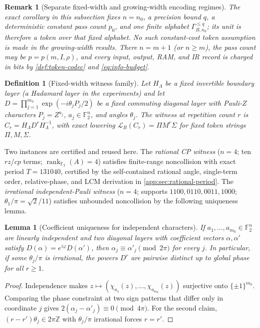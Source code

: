 \documentclass[aps,prx,reprint,floatfix,superscriptaddress]{revtex4-2}
\newtheorem{definition}{Definition}
\newtheorem{lemma}{Lemma}
\newtheorem{remark}{Remark}
\newcommand{\Ftwo}{\mathbb{F}_2}
\begin{document}
\begin{remark}[Separate fixed-width and growing-width encoding regimes]
\label{rem:encoding-regimes}
The exact corollary in this subsection fixes $n=n_0$, a precision bound
$q$, a deterministic constant pass count $p_0$, and one finite alphabet
$\Gamma_{B,n_0}^{\leq q}$; its unit is therefore a token over that fixed
alphabet.  No such constant-cost token assumption is made in the
growing-width results.  There $n=m+1$ (or $n\geq m$), the pass count may be
$p=p(m,I,\rho)$, and every input, output, RAM, and IR record is charged in
bits by \cref{def:token-codec} and \eqref{eq:info-budget}.
\end{remark}

\begin{definition}[Fixed-width witness family]
\label{def:witness-family}
Let $H_\Lambda$ be a fixed invertible boundary layer (a Hadamard layer in
the experiments) and let
$D = \prod_{j=1}^{m_0} \exp(-i\theta_j P_j/2)$
be a fixed commuting diagonal layer with Pauli-$Z$ characters
$P_j = Z^{a_j}$, $a_j \in \Ftwo^{n}$, and angles $\theta_j$. The witness
at repetition count $r$ is $C_r = H_\Lambda D^{r} H_\Lambda^{-1}$, with
exact lowering $\mathcal{L}_B(C_r) = \Pi M^r \Sigma$ for fixed token
strings $\Pi, M, \Sigma$.
\end{definition}

Two instances are certified and reused here. The
\emph{rational CP witness} ($n = 4$; ten $rz$/$cp$ terms;
$\operatorname{rank}_{\Ftwo}(A) = 4$) satisfies finite-range noncollision
with exact period $T = 131040$, certified by the self-contained rational
angle, single-term order, relative-phase, and LCM derivation in
\cref{app:sec:rational-period}. The
\emph{irrational independent-Pauli witness} ($n = 4$; supports
$1100, 0110, 0011, 1000$; $\theta_1/\pi = \sqrt{2}/11$) satisfies
unbounded noncollision by the following uniqueness lemma.

\begin{lemma}[Coefficient uniqueness for independent characters]
\label{lem:coeff-uniqueness}
If $a_1,\ldots,a_{m_0} \in \Ftwo^{n}$ are linearly independent and two
diagonal layers with coefficient vectors $\alpha, \alpha'$ satisfy
$D(\alpha) = e^{i\varphi} D(\alpha')$, then
$\alpha_j \equiv \alpha'_j \pmod{2\pi}$ for every $j$. In particular, if
some $\theta_j/\pi$ is irrational, the powers $D^{r}$ are pairwise
distinct up to global phase for all $r \geq 1$.
\end{lemma}

\begin{proof}
Independence makes
$z \mapsto (\chi_{a_1}(z),\ldots,\chi_{a_{m_0}}(z))$ surjective onto
$\{\pm 1\}^{m_0}$. Comparing the phase constraint at two sign patterns
that differ only in coordinate $j$ gives
$2(\alpha_j - \alpha'_j) \equiv 0 \pmod{4\pi}$. For the second claim,
$(r-r')\theta_j \in 2\pi\mathbb{Z}$ with $\theta_j/\pi$ irrational forces
$r = r'$.
\end{proof}
\end{document}
